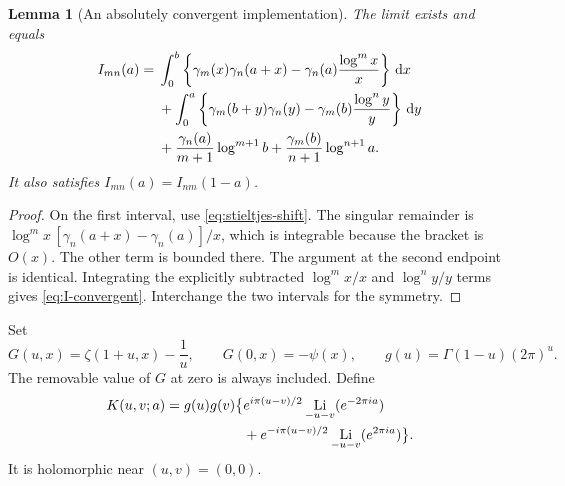 \documentclass[11pt]{article}
\numberwithin{equation}{section}
\newtheorem{lemma}[theorem]{Lemma}
\theoremstyle{definition}
\theoremstyle{remark}
\DeclareMathOperator{\Li}{Li}
\newcommand{\dd}{\,\mathrm d}
\begin{document}
\begin{lemma}[An absolutely convergent implementation]
\label{lem:FP-exists}
The limit exists and equals
\begin{align}
 I_{mn}(a)={}&\int_0^b\left\{\gamma_m(x)\gamma_n(a+x)
               -\gamma_n(a)\frac{\log^m x}{x}\right\}\dd x\notag\\
 &+\int_0^a\left\{\gamma_m(b+y)\gamma_n(y)
               -\gamma_m(b)\frac{\log^n y}{y}\right\}\dd y\notag\\
 &+\frac{\gamma_n(a)}{m+1}\log^{m+1}b
  +\frac{\gamma_m(b)}{n+1}\log^{n+1}a.
 \label{eq:I-convergent}
\end{align}
It also satisfies $I_{mn}(a)=I_{nm}(1-a)$.
\end{lemma}
\begin{proof}
On the first interval, use \eqref{eq:stieltjes-shift}. The singular
remainder is
$\log^m x\,[\gamma_n(a+x)-\gamma_n(a)]/x$, which is integrable because
the bracket is $O(x)$. The other term is bounded there. The argument at
the second endpoint is identical. Integrating the explicitly subtracted
$\log^m x/x$ and $\log^n y/y$ terms gives
\eqref{eq:I-convergent}. Interchange the two intervals for the symmetry.
\end{proof}

Set
\begin{equation}
 G(u,x)=\zeta(1+u,x)-\frac1u,
 \qquad G(0,x)=-\psi(x),\qquad g(u)=\Gamma(1-u)(2\pi)^u.
 \label{eq:G}
\end{equation}
The removable value of $G$ at zero is always included. Define
\begin{align}
 K(u,v;a)=g(u)g(v)\bigl\{
 &e^{i\pi(u-v)/2}\Li_{-u-v}(e^{-2\pi ia})\notag\\
 &+e^{-i\pi(u-v)/2}\Li_{-u-v}(e^{2\pi ia})\bigr\}.
 \label{eq:K-polylog}
\end{align}
It is holomorphic near $(u,v)=(0,0)$.
\end{document}
